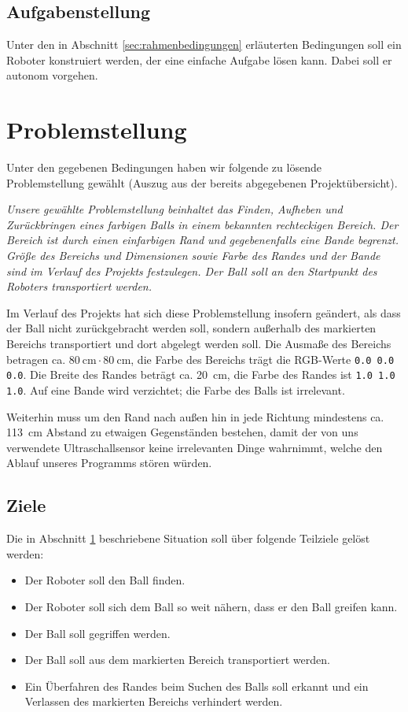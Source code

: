 \documentclass{fetch-my-doc}
\begin{document}
    \subsection{Aufgabenstellung}
      Unter den in Abschnitt \ref{sec:rahmenbedingungen} erläuterten Bedingungen soll ein Roboter konstruiert werden, der eine einfache Aufgabe lösen kann. Dabei soll er autonom vorgehen.
      
    
  \section{Problemstellung}\label{sec:problemstellung}
    Unter den gegebenen Bedingungen haben wir folgende zu lösende Problemstellung gewählt (Auszug aus der bereits abgegebenen Projektübersicht).
    
    \glqq\textit{Unsere gewählte Problemstellung beinhaltet das Finden, Aufheben und Zurückbringen eines farbigen Balls in einem bekannten rechteckigen Bereich. Der Bereich ist durch einen einfarbigen Rand und gegebenenfalls eine Bande begrenzt. Größe des Bereichs und Dimensionen sowie Farbe des Randes und der Bande sind im Verlauf des Projekts festzulegen. Der Ball soll an den Startpunkt des Roboters transportiert werden.}\grqq
    
    Im Verlauf des Projekts hat sich diese Problemstellung insofern geändert, als dass der Ball nicht zurückgebracht werden soll, sondern außerhalb des markierten Bereichs transportiert und dort abgelegt werden soll. Die Ausmaße des Bereichs betragen ca. $\SI{80}{\centi\meter} \cdot \SI{80}{\centi\meter}$, die Farbe des Bereichs trägt die RGB-Werte \verb+0.0 0.0 0.0+. Die Breite des Randes beträgt ca. \SI{20}{\centi\meter}, die Farbe des Randes ist \verb+1.0 1.0 1.0+. Auf eine Bande wird verzichtet; die Farbe des Balls ist irrelevant.
    
    Weiterhin muss um den Rand nach außen hin in jede Richtung mindestens ca. \SI{113}{\centi\meter} Abstand zu etwaigen Gegenständen bestehen, damit der von uns verwendete Ultraschallsensor keine irrelevanten Dinge wahrnimmt, welche den Ablauf unseres Programms stören würden.
  
    \subsection{Ziele}
      Die in Abschnitt \ref{sec:problemstellung} beschriebene Situation soll über folgende Teilziele gelöst werden:
      \begin{itemize}
        \item Der Roboter soll den Ball finden.
        \item Der Roboter soll sich dem Ball so weit nähern, dass er den Ball greifen kann.
        \item Der Ball soll gegriffen werden.
        \item Der Ball soll aus dem markierten Bereich transportiert werden.
        \item Ein Überfahren des Randes beim Suchen des Balls soll erkannt und ein Verlassen des markierten Bereichs verhindert werden.
      \end{itemize}
      
\end{document}
